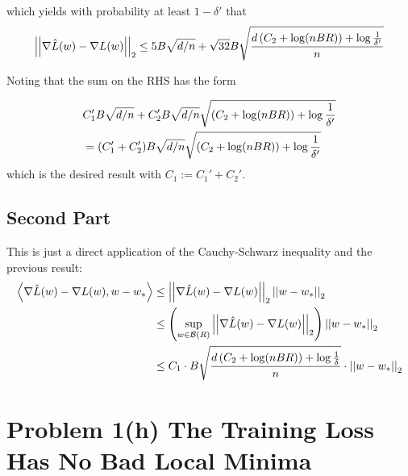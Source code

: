 \documentclass[11pt]{article}
\newcommand{\1}{\mathbb{I}} %
\begin{document}
which yields with probability at least $1 - \delta'$ that
\begin{align}
	\left|\left| \nabla \hat L(w) - \nabla L(w) \right|\right|_{2} \leq 5 B \sqrt{d/n} +  \sqrt{32}B \sqrt{
		\dfrac{d \left( C_2 + \log(nBR) \right) + \log\frac{1}{\delta'}}{n}
	}  
\end{align}

Noting that the sum on the RHS has the form 

\begin{align}
	&C_1' B \sqrt{d/n} + C_2' B \sqrt{d/n} \sqrt{
		\left( C_2 + \log(nBR) \right) + \log\frac{1}{\delta'}
	}  \\
	&= (C_1' + C_2') B \sqrt{d/n} \sqrt{
		\left( C_2 + \log(nBR) \right) + \log\frac{1}{\delta'}
	}  
\end{align}
which is the desired result with $C_1 := C_1' + C_2'$. 




\clearpage
\subsection*{Second Part}

This is just a direct application of the Cauchy-Schwarz inequality and the previous result:
\begin{align}
	\left\langle \nabla \hat L(w) - \nabla L(w), w - w_* \right\rangle	
		&\leq \left|\left| \nabla \hat L(w) - \nabla L(w) \right|\right|_{2} \left|\left| w - w_* \right|\right|_{2}  \\
		&\leq \left(  \sup_{w \in \mathcal B(R)} \left|\left| \nabla \hat L(w) - \nabla L(w) \right|\right|_{2}  \right)  \left|\left| w - w_* \right|\right|_{2}  \\
		&\leq C_1 \cdot B \sqrt{
			\dfrac{d \left( C_2 + \log(nBR) \right) + \log\frac{1}{\delta}}{n}
		} \cdot \left|\left| w - w_* \right|\right|_{2}
\end{align}



\clearpage
\section*{Problem 1(h) The Training Loss Has No Bad Local Minima}
\end{document}
